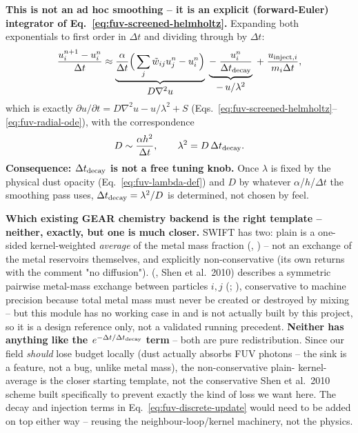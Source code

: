 \textbf{This is not an ad hoc smoothing -- it is an explicit
(forward-Euler) integrator of Eq.~\ref{eq:fuv-screened-helmholtz}.}
Expanding both exponentials to first order in $\Delta t$ and
dividing through by $\Delta t$:
\begin{equation}
  \frac{u_i^{n+1}-u_i^n}{\Delta t} \approx
    \underbrace{\frac{\alpha}{\Delta t}\Big(\sum_j\tilde w_{ij}u_j^n - u_i^n\Big)}_{\textstyle D\nabla^2 u}
    \;\underbrace{-\;\frac{u_i^n}{\Delta t_{\rm decay}}}_{\textstyle -\,u/\lambda^2}
    \;+\; \frac{u_{{\rm inject},i}}{m_i\Delta t} ,
  \label{eq:fuv-discrete-continuum-limit}
\end{equation}
which is exactly $\partial u/\partial t = D\nabla^2 u - u/\lambda^2 + S$
(Eqs.~\ref{eq:fuv-screened-helmholtz}--\ref{eq:fuv-radial-ode}), with
the correspondence
\begin{equation}
  D \sim \frac{\alpha h^2}{\Delta t}, \qquad
  \lambda^2 = D\,\Delta t_{\rm decay} .
  \label{eq:fuv-discrete-correspondence}
\end{equation}
\textbf{Consequence: $\Delta t_{\rm decay}$ is not a free tuning knob.}
Once $\lambda$ is fixed by the physical dust opacity
(Eq.~\ref{eq:fuv-lambda-def}) and $D$ by whatever $\alpha$/$h$/$\Delta t$
the smoothing pass uses, $\Delta t_{\rm decay}=\lambda^2/D$ is
determined, not chosen by feel.

\textbf{Which existing GEAR chemistry backend is the right template --
neither, exactly, but one is much closer.} SWIFT has two: plain
 is a one-sided kernel-weighted
\emph{average} of the metal mass fraction (,
) -- not an exchange of the metal
reservoirs themselves, and explicitly non-conservative (its own
 returns  with the comment
"no diffusion"). 
(, Shen et al.\ 2010) describes a
symmetric pairwise metal-mass exchange between particles $i,j$
(;
), conservative to machine
precision because total metal mass must never be created or destroyed
by mixing -- but this module has no working 
case in  and is not actually built by this project,
so it is a design reference only, not a validated running precedent.
\textbf{Neither has anything like the $e^{-\Delta
t/\Delta t_{\rm decay}}$ term} -- both are pure redistribution.
Since our field \emph{should} lose budget locally (dust actually
absorbs FUV photons -- the sink is a feature, not a bug, unlike metal
mass), the non-conservative plain- kernel-average is the
closer starting template, not the conservative Shen et al.\ 2010
scheme built specifically to prevent exactly the kind of loss we want
here. The decay and injection terms in
Eq.~\ref{eq:fuv-discrete-update} would need to be added on top either
way -- reusing the neighbour-loop/kernel machinery, not the physics.

